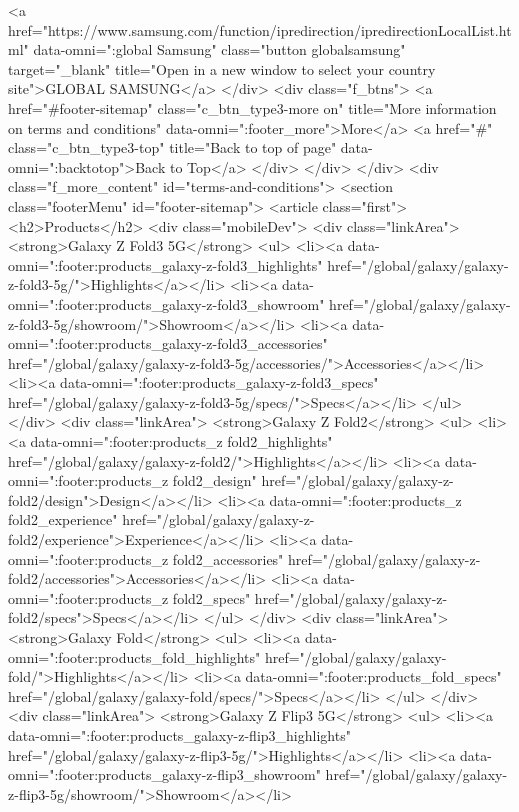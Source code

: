 {{{{{{{{{{{{{{{{{{{{{{{{{{{{{{{{{{{{{{{{{{{{{{{{{{{{{					<a href="https://www.samsung.com/function/ipredirection/ipredirectionLocalList.html" data-omni=":global Samsung" class="button globalsamsung" target="_blank" title="Open in a new window to select your country site">GLOBAL SAMSUNG</a>
				</div>
				<div class="f_btns">
					<a href="#footer-sitemap" class="c_btn_type3-more on" title="More information on terms and conditions" data-omni=":footer_more">More</a>
					<a href="#" class="c_btn_type3-top" title="Back to top of page" data-omni=":backtotop">Back to Top</a>
				</div>
			</div>
		</div>
		<div class="f_more_content" id="terms-and-conditions">
			<section class="footerMenu" id="footer-sitemap">
				<article class="first">
	<h2>Products</h2>
	<div class="mobileDev">
		<div class="linkArea">
			<strong>Galaxy Z Fold3 5G</strong>
			<ul>
				<li><a data-omni=":footer:products_galaxy-z-fold3_highlights" href="/global/galaxy/galaxy-z-fold3-5g/">Highlights</a></li>
				<li><a data-omni=":footer:products_galaxy-z-fold3_showroom" href="/global/galaxy/galaxy-z-fold3-5g/showroom/">Showroom</a></li>
				<li><a data-omni=":footer:products_galaxy-z-fold3_accessories" href="/global/galaxy/galaxy-z-fold3-5g/accessories/">Accessories</a></li>
				<li><a data-omni=":footer:products_galaxy-z-fold3_specs" href="/global/galaxy/galaxy-z-fold3-5g/specs/">Specs</a></li>
			</ul>
		</div>
		<div class="linkArea">
			<strong>Galaxy Z Fold2</strong>
			<ul>
				<li><a data-omni=":footer:products_z fold2_highlights" href="/global/galaxy/galaxy-z-fold2/">Highlights</a></li>
				<li><a data-omni=":footer:products_z fold2_design" href="/global/galaxy/galaxy-z-fold2/design">Design</a></li>
				<li><a data-omni=":footer:products_z fold2_experience" href="/global/galaxy/galaxy-z-fold2/experience">Experience</a></li>
				<li><a data-omni=":footer:products_z fold2_accessories" href="/global/galaxy/galaxy-z-fold2/accessories">Accessories</a></li>
				<li><a data-omni=":footer:products_z fold2_specs" href="/global/galaxy/galaxy-z-fold2/specs">Specs</a></li>
			</ul>
		</div>
		<div class="linkArea">
			<strong>Galaxy Fold</strong>
			<ul>
				<li><a data-omni=":footer:products_fold_highlights" href="/global/galaxy/galaxy-fold/">Highlights</a></li>
				<li><a data-omni=":footer:products_fold_specs" href="/global/galaxy/galaxy-fold/specs/">Specs</a></li>
			</ul>
		</div>
		<div class="linkArea">
			<strong>Galaxy Z Flip3 5G</strong>
			<ul>
				<li><a data-omni=":footer:products_galaxy-z-flip3_highlights" href="/global/galaxy/galaxy-z-flip3-5g/">Highlights</a></li>
				<li><a data-omni=":footer:products_galaxy-z-flip3_showroom" href="/global/galaxy/galaxy-z-flip3-5g/showroom/">Showroom</a></li>
}}}}}}}}}}}}}}}}}}}}}}}}}}}}}}}}}}}}}}}}}}}}}}}}}}}}}
